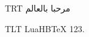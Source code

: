 \documentclass{article}
\begin{document}
\textdir TRT مرحبا بالعالم
\par
\textdir TLT \normalfont LuaHBTeX 123.
\end{document}

